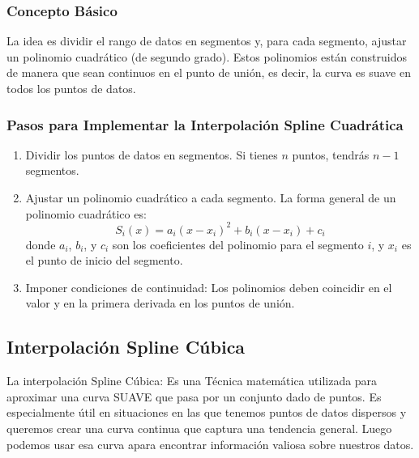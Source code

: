 \documentclass[12pt]{article}
\begin{document}
    \subsubsection{Concepto Básico}
    La idea es dividir el rango de datos en segmentos y, para cada segmento, ajustar 
    un polinomio cuadrático (de segundo grado). Estos polinomios están construidos de 
    manera que sean continuos en el punto de unión, es decir, la curva es suave en todos 
    los puntos de datos.
    \subsubsection{Pasos para Implementar la Interpolación Spline Cuadrática}
     \begin{enumerate}
        \item Dividir los puntos de datos en segmentos. Si tienes $n$ puntos, tendrás $n-1$ segmentos.
        \item Ajustar un polinomio cuadrático a cada segmento. La forma general de un polinomio cuadrático es:
        \[S_i(x) = a_i (x - x_i)^2 + b_i (x - x_i) + c_i\]
        donde $a_i$, $b_i$, y $c_i$ son los coeficientes del polinomio para el segmento $i$, y $x_i$ es el punto 
        de inicio del segmento.
        \item Imponer condiciones de continuidad: Los polinomios deben coincidir en el valor y en la primera 
        derivada en los puntos de unión.
      \end{enumerate}

\subsection{Interpolación Spline Cúbica}
La interpolación Spline Cúbica: Es una Técnica matemática utilizada para 
aproximar una curva SUAVE que pasa por un conjunto dado de puntos. Es especialmente
útil en situaciones en las que tenemos puntos de datos dispersos y queremos crear 
una curva continua que captura una tendencia general.
Luego podemos usar esa curva apara encontrar información valiosa sobre nuestros
datos. 
\end{document}
